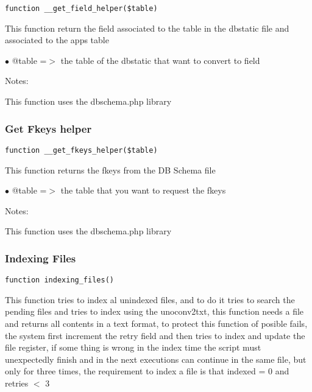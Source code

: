 \documentclass[a4paper]{article}
\begin{document}
\begin{lstlisting}
function __get_field_helper($table)
\end{lstlisting}

This function return the field associated to the table in the dbstatic
file and associated to the apps table

\begin{compactitem}
\item[\color{myblue}$\bullet$] @table =$>$ the table of the dbstatic that want to convert to field
\end{compactitem}

Notes:

This function uses the dbschema.php library

\hypertarget{toc485}{}
\subsubsection{Get Fkeys helper}

\begin{lstlisting}
function __get_fkeys_helper($table)
\end{lstlisting}

This function returns the fkeys from the DB Schema file

\begin{compactitem}
\item[\color{myblue}$\bullet$] @table =$>$ the table that you want to request the fkeys
\end{compactitem}

Notes:

This function uses the dbschema.php library

\hypertarget{toc486}{}
\subsubsection{Indexing Files}

\begin{lstlisting}
function indexing_files()
\end{lstlisting}

This function tries to index al unindexed files, and to do it tries to search
the pending files and tries to index using the unoconv2txt, this function needs
a file and returns all contents in a text format, to protect this function of
posible fails, the system first increment the retry field and then tries to
index and update the file register, if some thing is wrong in the index time
the script must unexpectedly finish and in the next executions can continue
in the same file, but only for three times, the requirement to index a file
is that indexed = 0 and retries $<$ 3
\end{document}
